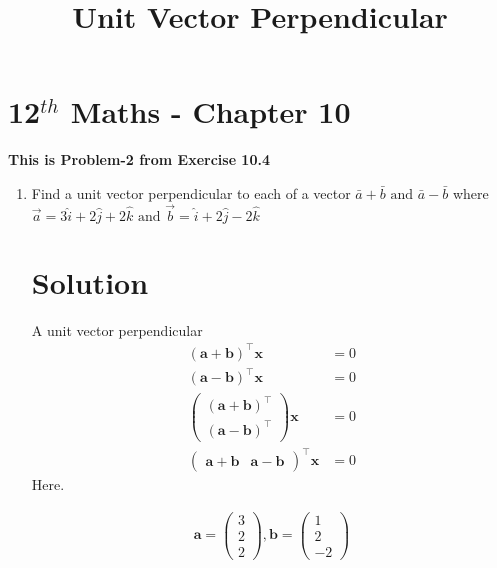 \documentclass[12pt]{article}
\newcommand{\myvec}[1]{\ensuremath{\begin{pmatrix}#1\end{pmatrix}}}
\let\vec\mathbf
\begin{document}
\begin{center}
\title{\textbf{  Unit Vector Perpendicular}}
\date{\vspace{-5ex}} %
\maketitle
\end{center}
\setcounter{page}{1}
\section{12$^{th}$ Maths - Chapter 10}
\textbf{This is Problem-2 from Exercise 10.4}
\begin{enumerate}

\item Find a unit vector  perpendicular to each of a vector $\bar{a}+\bar{b} \text{ and }\bar{a}-\bar{b}$ where  $\overrightarrow{a}=3\hat{i}+2\hat{j}+2\hat{k}\text{ and }\overrightarrow{b}=\hat{i}+2\hat{j}-2\hat{k}$
\section{Solution}
A unit vector  perpendicular
\begin{align} 
(\vec{a}+\vec{b})^\top\vec{x}&=0 \\
(\vec{a}-\vec{b})^\top\vec{x}&=0\\
\myvec{(\vec{a}+\vec{b})^\top\\ (\vec{a}-\vec{b})^\top}\vec{x}&=0\\
\myvec{\vec{a}+\vec{b}& \vec{a}-\vec{b}}^\top\vec{x}&=0\label{4}
\end{align}
Here.

\begin{align}
\vec{a}=\myvec{3\\2\\2},
\vec{b}=\myvec{1\\2\\-2}
\end{align}


\end{enumerate}
\end{document}
